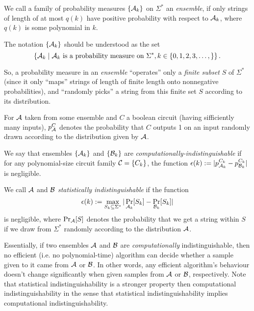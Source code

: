 \message{ !name(seminar.tex)}\documentclass{llncs}
\begin{document}
\begin{definition}[Ensemble]
  We call a family of probability measures $\{{\cal A}_k\}$ on $\Sigma^*$ an \emph{ensemble}, if only strings of length of at most $q(k)$ have positive probability with respect to ${\cal A}_k$, where $q(k)$ is some polynomial in $k$.
\end{definition}

The notation $\left\{ {\cal A}_k \right\}$ should be understood as the set
\begin{equation*}
\left\{ {\cal A}_k \mid {\cal A}_k \text{ is a probability measure on } \Sigma^*, k\in\left\{ 0,1,2,3,\dots, \right\} \right\}.
\end{equation*}

So, a probability measure in an \emph{ensemble} ``operates'' only a \emph{finite subset} $S$ of $\Sigma^*$ (since it only ``maps'' strings of length of finite length onto nonnegative probabilities), and ``randomly picks'' a string from this finite set $S$ according to its distribution.

\begin{definition}[Indistinguishability]
  For ${\cal A}$ taken from some ensemble and $C$ a boolean circuit (having sifficiently many inputs), $p_{\cal A}^C$ denotes the probability that $C$ outputs 1 on an input randomly drawn according to the distribution given by ${\cal A}$.

  We say that ensembles $\left\{{\cal A}_k\right\}$ and $\left\{{\cal B}_k\right\}$ are \emph{computationally-indistinguishable} if for any polynomial-size circuit family ${\cal C}=\{C_k\}$, the function $\epsilon(k):=|p_{{\cal A}_k}^{C_k}-p_{{\cal B}_k}^{C_k}|$ is negligible.
  
  We call ${\cal A}$ and ${\cal B}$ \emph{statistically indistinguishable} if the function 
  \begin{equation*}
\epsilon(k):=\max_{S_k\subseteq \Sigma^*}|\Pr_{{\cal A}_k}[S_k]-\Pr_{{\cal B}_k}[S_k]|
\end{equation*}
is negligible, where $\Pr_{{\cal A}}[S]$ denotes the probability that we get a string within $S$ if we draw from $\Sigma^*$ randomly according to the distribution ${\cal A}$.
\end{definition}

Essentially, if two ensembles ${\cal A}$ and ${\cal B}$ are \emph{computationally} indistinguishable, then no efficient (i.e. no polynomial-time) algorithm can decide whether a sample given to it came from ${\cal A}$ or ${\cal B}$. In other words, any efficient algorithm's behaviour doesn't change significantly when given samples from ${\cal A}$ or ${\cal B}$, respectively. Note that statistical indistinguishability is a stronger property then computational indistinguishability in the sense that statistical indistinguishability implies computational indistinguishability.
\end{document}

